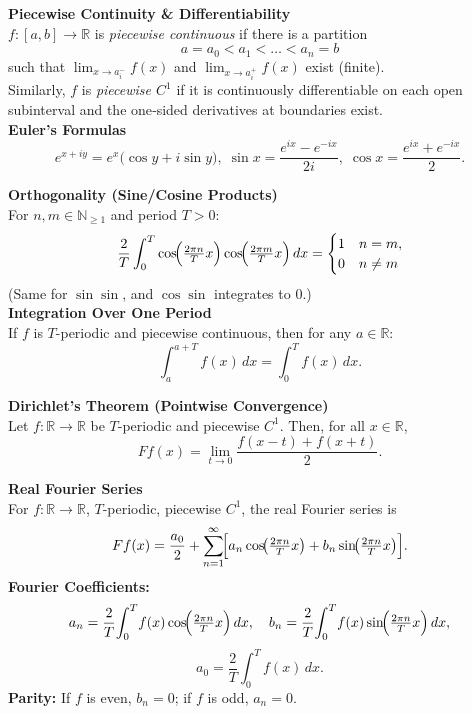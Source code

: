 \documentclass[8pt]{article}
\begin{document}
\begin{multicols}{2}

\noindent \textbf{Piecewise Continuity \& Differentiability}\\
$f:[a,b]\to\mathbb{R}$ is \emph{piecewise continuous} if there is a partition
\[
  a=a_0 < a_1 < \dots < a_n = b
\]
such that $\lim_{x \to a_i^-} f(x)$ and $\lim_{x \to a_i^+} f(x)$ exist (finite).\\
Similarly, $f$ is \emph{piecewise $C^1$} if it is continuously differentiable on each open subinterval and the one‐sided derivatives at boundaries exist.\\

\noindent \textbf{Euler's Formulas}
\[
  e^{x+iy} = e^{x}\bigl(\cos y + i \sin y\bigr),\;
  \sin x = \frac{e^{ix}-e^{-ix}}{2i},\;
  \cos x = \frac{e^{ix}+e^{-ix}}{2}.
\]

\noindent \textbf{Orthogonality (Sine/Cosine Products)}\\
For $n,m \in \mathbb{N}_{\ge 1}$ and period $T>0$:
\[
  \frac{2}{T} \int_{0}^{T}
  \cos\!\Bigl(\tfrac{2\pi n}{T}x\Bigr)\cos\!\Bigl(\tfrac{2\pi m}{T}x\Bigr)\,dx
=
\begin{cases}
1 & n=m,\\
0 & n\neq m
\end{cases}
\]
(Same for $\sin\sin$, and $\cos\sin$ integrates to $0$.)\\

\noindent \textbf{Integration Over One Period}\\
If $f$ is $T$-periodic and piecewise continuous, then for any $a\in\mathbb{R}$:
\[
  \int_{a}^{a+T} f(x)\,dx = \int_{0}^{T} f(x)\,dx.
\]

\noindent \textbf{Dirichlet's Theorem (Pointwise Convergence)}\\
Let \( f : \mathbb{R} \to \mathbb{R} \) be \( T \)-periodic and piecewise \( C^1 \). Then, for all \( x \in \mathbb{R} \),
\[
  Ff(x) = \lim_{t \to 0} \frac{f(x - t) + f(x + t)}{2}.
\]

\noindent \textbf{Real Fourier Series}\\
For $f:\mathbb{R}\to\mathbb{R}$, $T$-periodic, piecewise $C^1$, the real Fourier series is \vspace{-3px}
\[ \vspace{-8px}
  Ff(x)= \frac{a_{0}}{2}
   + \sum_{n=1}^{\infty}\!\Bigl[a_{n}\cos\!\bigl(\tfrac{2\pi n}{T}x\bigr)
   + b_{n}\sin\!\bigl(\tfrac{2\pi n}{T}x\bigr)\Bigr].
\]
\noindent \textbf{Fourier Coefficients:} \vspace{-3px}
\[
  a_{n} = \frac{2}{T}\!\int_{0}^{T}\!f(x)
          \cos\!\Bigl(\tfrac{2\pi n}{T}x\Bigr)\,dx,\quad
  b_{n} = \frac{2}{T}\!\int_{0}^{T}\!f(x)
          \sin\!\Bigl(\tfrac{2\pi n}{T}x\Bigr)\,dx,
\] \vspace{-8px}
\[
  a_{0} = \frac{2}{T}\int_{0}^{T} f(x)\,dx.
\]
\noindent \textbf{Parity:} If $f$ is even, $b_{n}=0$; if $f$ is odd, $a_{n}=0$.\\


\end{multicols}
\end{document}
